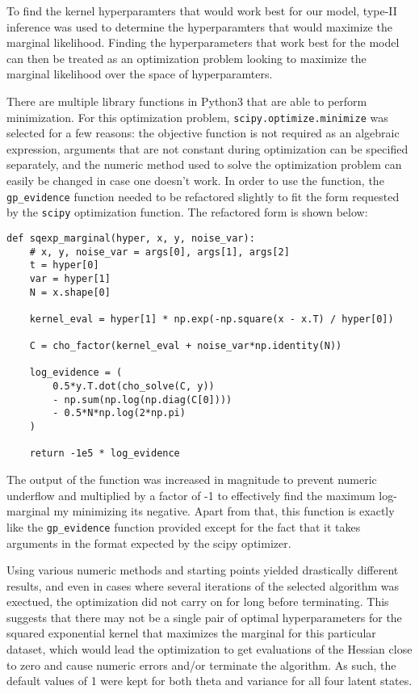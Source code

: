 To find the kernel hyperparamters that would work best for our model, type-II inference was used to determine the hyperparamters that would maximize the marginal likelihood. Finding the hyperparameters that work best for the model can then be treated as an optimization problem looking to maximize the marginal likelihood over the space of hyperparamters.

There are multiple library functions in Python3 that are able to perform minimization. For this optimization problem, \verb+scipy.optimize.minimize+ was selected for a few reasons: the objective function is not required as an algebraic expression, arguments that are not constant during optimization can be specified separately, and the numeric method used to solve the optimization problem can easily be changed in case one doesn't work. In order to use the function, the \verb+gp_evidence+ function needed to be refactored slightly to fit the form requested by the \verb+scipy+ optimization function. The refactored form is shown below:

\begin{verbatim}
def sqexp_marginal(hyper, x, y, noise_var):
    # x, y, noise_var = args[0], args[1], args[2]
    t = hyper[0]
    var = hyper[1]
    N = x.shape[0]
    
    kernel_eval = hyper[1] * np.exp(-np.square(x - x.T) / hyper[0])

    C = cho_factor(kernel_eval + noise_var*np.identity(N))
    
    log_evidence = (
        0.5*y.T.dot(cho_solve(C, y))
        - np.sum(np.log(np.diag(C[0])))
        - 0.5*N*np.log(2*np.pi)
    )

    return -1e5 * log_evidence
\end{verbatim}

The output of the function was increased in magnitude to prevent numeric underflow and multiplied by a factor of -1 to effectively find the maximum log-marginal my minimizing its negative. Apart from that, this function is exactly like the \verb+gp_evidence+ function provided except for the fact that it takes arguments in the format expected by the scipy optimizer.

Using various numeric methods and starting points yielded drastically different results, and even in cases where several iterations of the selected algorithm was exectued, the optimization did not carry on for long before terminating. This suggests that there may not be a single pair of optimal hyperparameters for the squared exponential kernel that maximizes the marginal for this particular dataset, which would lead the optimization to get evaluations of the Hessian close to zero and cause numeric errors and/or terminate the algorithm. As such, the default values of 1 were kept for both theta and variance for all four latent states.



















